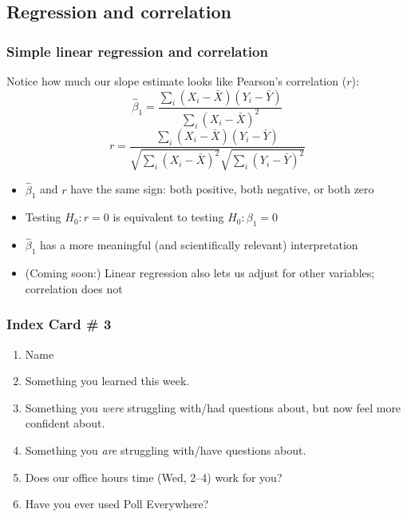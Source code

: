 \documentclass[12pt, 
hyperref={colorlinks=true, linkcolor=blue, urlcolor=cyan},dvipsnames]{beamer}
\begin{document}
\subsection{Regression and correlation}
\begin{frame}
\frametitle{Simple linear regression and correlation}

Notice how much our slope estimate looks like Pearson's correlation ($r$): 
$$\hat\beta_1 = \frac{\sum_i \left(X_i - \bar{X}\right)\left(Y_i - \bar{Y}\right)}{\sum_i \left(X_i - \bar{X}\right)^2}$$
$$r = \frac{\sum_i \left(X_i - \bar{X}\right)\left(Y_i - \bar{Y}\right)}{\sqrt{\sum_i\left(X_i - \bar{X}\right)^2} \sqrt{\sum_i \left(Y_i - \bar{Y}\right)^2}}$$ \pause

\begin{itemize}\vspace{-0.3cm}
\item $\hat\beta_1$ and $r$ have the same sign: both positive, both negative, or both zero
\item Testing $H_0: r = 0$ is equivalent to testing $H_0: \beta_1 = 0$
\item $\hat\beta_1$ has a more meaningful (and scientifically relevant) interpretation
\item (Coming soon:) Linear regression also lets us adjust for other variables; correlation does not
\end{itemize}

\end{frame}


\begin{frame}
\frametitle{Index Card \# 3}

\begin{enumerate}
\item Name
\item Something you learned this week.
\item Something you \textit{were} struggling with/had questions about, but now feel more confident about.
\item Something you \textit{are} struggling with/have questions about.
\item Does our office hours time (Wed, 2--4) work for you?
\item Have you ever used Poll Everywhere?
\end{enumerate}

\end{frame}
\end{document}
